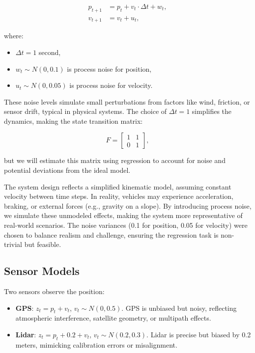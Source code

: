 \documentclass[12pt]{article}
\begin{document}
\begin{align}
    p_{t+1} &= p_t + v_t \cdot \Delta t + w_t, \label{eq:sim_position} \\
    v_{t+1} &= v_t + u_t, \label{eq:sim_velocity}
\end{align}

where:
\begin{itemize}
    \item \( \Delta t = 1 \) second,
    \item \( w_t \sim N(0, 0.1) \) is process noise for position,
    \item \( u_t \sim N(0, 0.05) \) is process noise for velocity.
\end{itemize}

These noise levels simulate small perturbations from factors like wind, friction, or sensor drift, typical in physical systems. The choice of \( \Delta t = 1 \) simplifies the dynamics, making the state transition matrix:

\begin{equation}
    F = \begin{bmatrix} 1 & 1 \\ 0 & 1 \end{bmatrix},
    \label{eq:sim_F}
\end{equation}

but we will estimate this matrix using regression to account for noise and potential deviations from the ideal model.

The system design reflects a simplified kinematic model, assuming constant velocity between time steps. In reality, vehicles may experience acceleration, braking, or external forces (e.g., gravity on a slope). By introducing process noise, we simulate these unmodeled effects, making the system more representative of real-world scenarios. The noise variances (0.1 for position, 0.05 for velocity) were chosen to balance realism and challenge, ensuring the regression task is non-trivial but feasible.

\subsection{Sensor Models}
\label{subsec:sensor_models}

Two sensors observe the position:
\begin{itemize}
    \item \textbf{GPS}: \( z_t = p_t + v_t \), \( v_t \sim N(0, 0.5) \). GPS is unbiased but noisy, reflecting atmospheric interference, satellite geometry, or multipath effects.
    \item \textbf{Lidar}: \( z_t = p_t + 0.2 + v_t \), \( v_t \sim N(0.2, 0.3) \). Lidar is precise but biased by 0.2 meters, mimicking calibration errors or misalignment.
\end{itemize}
\end{document}
